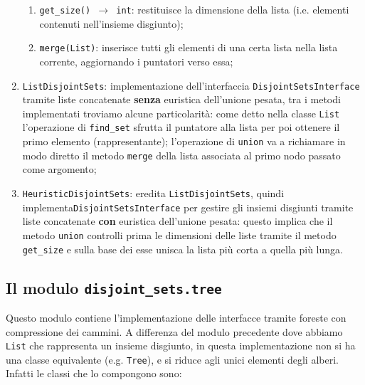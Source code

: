 \begin{enumerate}
\begin{enumerate}[resume]
                  \item \texttt{get\_size() $\rightarrow$ int}: restituisce la dimensione della lista (i.e. elementi
                        contenuti nell'insieme disgiunto);
                  \item \texttt{merge(List)}: inserisce tutti gli elementi di una certa lista nella lista corrente,
                        aggiornando i puntatori verso essa;
            \end{enumerate}
      \item \texttt{ListDisjointSets}: implementazione dell'interfaccia \texttt{DisjointSetsInterface} tramite liste concatenate
            \textbf{senza} euristica dell'unione pesata, tra i metodi
            implementati troviamo alcune particolarità: come detto nella classe \texttt{List} l'operazione di \texttt{find\_set}
            sfrutta il puntatore alla lista per poi ottenere il primo elemento (rappresentante); l'operazione di \texttt{union}
            va a richiamare in modo diretto il metodo \texttt{merge} della lista associata al primo nodo passato come argomento;\newpage
      \item \texttt{HeuristicDisjointSets}: eredita \texttt{ListDisjointSets}, quindi implementa\linebreak \texttt{DisjointSetsInterface}
            per gestire gli insiemi disgiunti tramite liste concatenate \textbf{con} euristica dell'unione pesata: questo implica
            che il metodo \texttt{union} controlli prima le dimensioni delle liste tramite il metodo \texttt{get\_size} e sulla base
            dei esse unisca la lista più corta a quella più lunga.
\end{enumerate}

\subsection{Il modulo \texttt{disjoint\_sets.tree}}
Questo modulo contiene l'implementazione delle interfacce tramite foreste con compressione dei cammini.
A differenza del modulo precedente dove abbiamo \texttt{List} che rappresenta un insieme disgiunto,
in questa implementazione non si ha una classe equivalente (e.g. \texttt{Tree}), e si riduce agli
unici elementi degli alberi. Infatti le classi che lo compongono sono:

